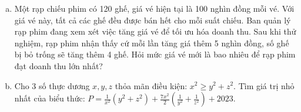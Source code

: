 \begin{ex} %
	\begin{enumerate}[a)]
		\item Một rạp chiếu phim có 120 ghế, giá vé hiện tại là 100 nghìn đồng mỗi vé. Với giá vé này, tất cả các ghế đều được bán hết cho mỗi suất chiếu. Ban quản lý rạp phim đang xem xét việc tăng giá vé để tối ưu hóa doanh thu. Sau khi thử nghiệm, rạp phim nhận thấy cứ mỗi lần tăng giá thêm 5 nghìn đồng, số ghế bị bỏ trống sẽ tăng thêm 4 ghế. Hỏi mức giá vé mới là bao nhiêu để rạp phim đạt doanh thu lớn nhất?
		\item Cho 3 số thực dương $x, y, z$ thỏa mãn điều kiện: $x^2 \ge y^2 + z^2$.
		Tìm giá trị nhỏ nhất của biểu thức: $P = \frac{1}{x^2}(y^2+z^2) + \frac{7x^2}{2}\left(\frac{1}{y^2}+\frac{1}{z^2}\right) + 2023$.
	\end{enumerate}
	\loigiai{}
\end{ex}

